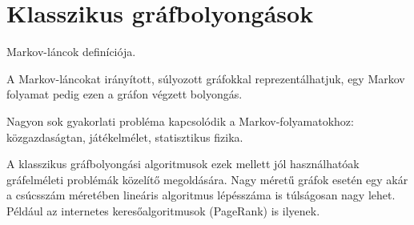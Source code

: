 \chapter{Klasszikus gráfbolyongások}

Markov-láncok definíciója.

A Markov-láncokat irányított, súlyozott gráfokkal reprezentálhatjuk, egy
Markov folyamat pedig ezen a gráfon végzett bolyongás.

Nagyon sok gyakorlati probléma kapcsolódik a Markov-folyamatokhoz:
közgazdaságtan, játékelmélet, statisztikus fizika.

A klasszikus gráfbolyongási algoritmusok ezek mellett jól használhatóak
gráfelméleti problémák közelítő megoldására. Nagy méretű gráfok esetén egy akár
a csúcsszám méretében lineáris algoritmus lépésszáma is túlságosan nagy lehet.
Például az internetes keresőalgoritmusok (PageRank) is ilyenek.

